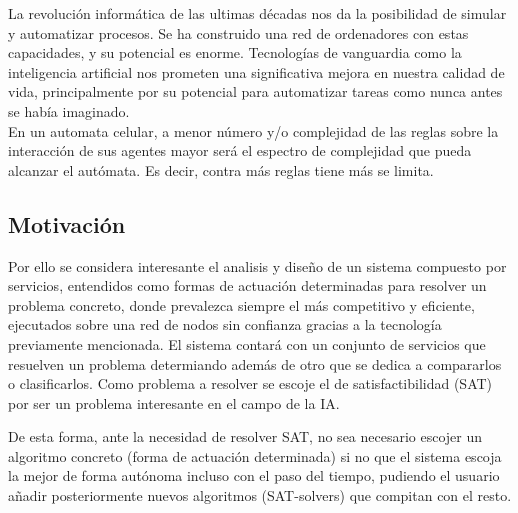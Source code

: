 \documentclass[11pt]{article}
\begin{document}
			La revolución informática de las ultimas décadas nos da la posibilidad de simular y automatizar procesos. 
			Se ha construido una red de ordenadores con estas capacidades, y su potencial es enorme.
			Tecnologías de vanguardia como la inteligencia artificial nos prometen
			una significativa mejora en nuestra calidad de vida, principalmente por su potencial para automatizar tareas como nunca antes se había imaginado. \\
			
			En un automata celular, a menor número y/o complejidad de las reglas sobre la interacción de sus agentes mayor será el espectro de complejidad que pueda alcanzar el autómata.
			Es decir, contra más reglas tiene más se limita. \\

		\subsection{Motivación}
			Por ello se considera interesante el analisis y diseño de un sistema compuesto por servicios, entendidos como formas de actuación determinadas para resolver un problema concreto, 
			donde prevalezca siempre el más competitivo y eficiente, ejecutados sobre una red de nodos sin confianza gracias a la tecnología previamente mencionada.
			El sistema contará con un conjunto de servicios que resuelven un problema determiando además de otro que se dedica a compararlos o clasificarlos. Como problema a resolver se escoje
			el de satisfactibilidad (SAT) por ser un problema interesante en el campo de la IA.

			De esta forma, ante la necesidad de resolver SAT, no sea necesario escojer un algoritmo concreto (forma de actuación determinada) si no que el sistema escoja la mejor de forma autónoma
			incluso con el paso del tiempo, pudiendo el usuario añadir posteriormente nuevos algoritmos (SAT-solvers) que compitan con el resto.
\end{document}
